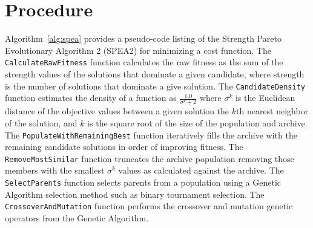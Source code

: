 \documentclass[a4paper, 11pt]{article}
\begin{document}
\section{Procedure}
\label{sec:procedure}
Algorithm~\ref{alg:spea} provides a pseudo-code listing of the Strength Pareto Evolutionary Algorithm 2 (SPEA2) for minimizing a cost function. 
The \texttt{CalculateRawFitness} function calculates the raw fitness as the sum of the strength values of the solutions that dominate a given candidate, where strength is the number of solutions that dominate a give solution.
The \texttt{CandidateDensity} function estimates the density of a function as $\frac{1.0}{\sigma^k + 2}$ where $\sigma^k$ is the Euclidean distance of the objective values between a given solution the $k$th nearest neighbor of the solution, and $k$ is the square root of the size of the population and archive.
The \texttt{PopulateWithRemainingBest} function iteratively fills the archive with the remaining candidate solutions in order of improving fitness.
The \texttt{RemoveMostSimilar} function truncates the archive population removing those members with the smallest $\sigma^k$ values as calculated against the archive.
The \texttt{SelectParents} function selects parents from a population using a Genetic Algorithm selection method such as binary tournament selection. The \texttt{CrossoverAndMutation} function performs the crossover and mutation genetic operators from the Genetic Algorithm.
\end{document}
